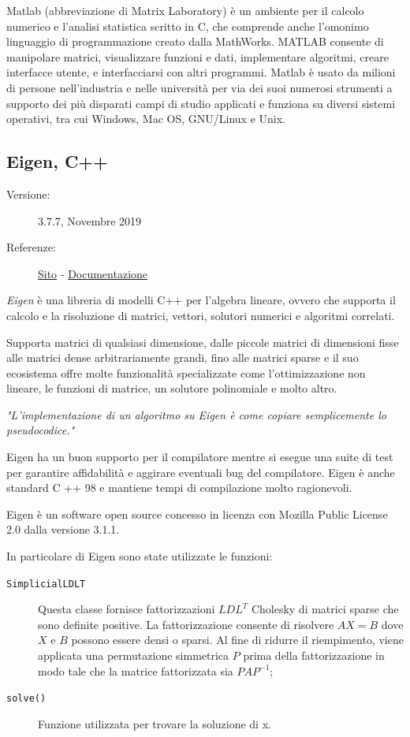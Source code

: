 \documentclass[preprint,12pt]{elsarticle}
\begin{document}
Matlab (abbreviazione di Matrix Laboratory) è un ambiente per il calcolo numerico e l'analisi statistica scritto in C, che comprende anche l'omonimo linguaggio di programmazione creato dalla MathWorks. MATLAB consente di manipolare matrici, visualizzare funzioni e dati, implementare algoritmi, creare interfacce utente, e interfacciarsi con altri programmi. Matlab è usato da milioni di persone nell'industria e nelle università per via dei suoi numerosi strumenti a supporto dei più disparati campi di studio applicati e funziona su diversi sistemi operativi, tra cui Windows, Mac OS, GNU/Linux e Unix.

\subsection{Eigen, C++}
\medskip
\begin{description}
	\item[Versione:] 3.7.7, Novembre 2019
	\item[Referenze:] \href{http://eigen.tuxfamily.org/index.php?title=Main_Page}{Sito} - \href{http://eigen.tuxfamily.org/dox/}{Documentazione}
\end{description}

\textit{Eigen} è una libreria di modelli C++ per l'algebra lineare, ovvero che supporta il calcolo e la risoluzione di matrici, vettori, solutori numerici e algoritmi correlati.

Supporta matrici di qualsiasi dimensione, dalle piccole matrici di dimensioni fisse alle matrici dense arbitrariamente grandi, fino alle matrici sparse e il suo ecosistema offre molte funzionalità specializzate come l'ottimizzazione non lineare, le funzioni di matrice, un solutore polinomiale e molto altro.

\textit{"L'implementazione di un algoritmo su Eigen è come copiare semplicemente lo pseudocodice."}

Eigen ha un buon supporto per il compilatore mentre si esegue una suite di test per garantire affidabilità e aggirare eventuali bug del compilatore. Eigen è anche standard C ++ 98 e mantiene tempi di compilazione molto ragionevoli.

Eigen è un software open source concesso in licenza con Mozilla Public License 2.0 dalla versione 3.1.1.

In particolare di Eigen sono state utilizzate le funzioni:
\begin{description}
	\item[\texttt{SimplicialLDLT}] Questa classe fornisce fattorizzazioni $LDL^ T$ Cholesky di matrici sparse che sono definite positive. La fattorizzazione consente di risolvere $AX = B$ dove $X$ e $B$ possono essere densi o sparsi. Al fine di ridurre il riempimento, viene applicata una permutazione simmetrica $P$ prima della fattorizzazione in modo tale che la matrice fattorizzata sia $PAP ^ {-1}$;
	\item[\texttt{solve()}] Funzione utilizzata per trovare la soluzione di x.
\end{description}
\end{document}
